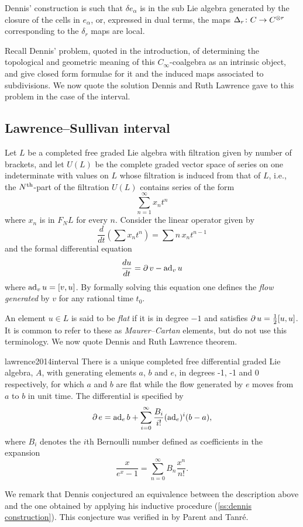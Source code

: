 Dennis' construction is such that $\delta e_\alpha$ is in the sub Lie algebra generated by the closure of the cells in $e_\alpha$, or, expressed in dual terms, the maps $\operatorname{\Delta}_r \colon C \to C^{\otimes r}$ corresponding to the $\delta_r$ maps are local.

Recall Dennis' problem, quoted in the introduction, of determining the topological and geometric meaning of this $C_\infty$-coalgebra as an intrinsic object, and give closed form formulae for it and the induced maps associated to subdivisions.
We now quote the solution Dennis and Ruth Lawrence gave to this problem in the case of the interval.

\subsection{Lawrence--Sullivan interval} \label{ss:LS interval}

Let $L$ be a completed free graded Lie algebra with filtration given by number of brackets, and let $U(L)$ be the complete graded vector space of series on one indeterminate with values on $L$ whose filtration is induced from that of $L$, i.e., the $N^{\mathrm{th}}$-part of the filtration $U(L)$ contains series of the form
\[
\sum_{n=1}^\infty x_n t^n
\]
where $x_n$ is in $F_N L$ for every $n$.
Consider the linear operator given by
\[
\frac{d}{dt} \left(\sum x_n t^n\right) = \sum n \, x_n t^{n-1}
\]
and the formal differential equation
\[
\frac{du}{dt} = \operatorname{\partial} v - \operatorname{ad}_v u
\]
where $\operatorname{ad}_v u = [v, u]$.
By formally solving this equation one defines the \textit{flow generated} by $v$ for any rational time $t_0$.

An element $u \in L$ is said to be \textit{flat} if it is in degree $-1$ and satisfies $\operatorname{\partial} u = \frac{1}{2} [u,u]$.
It is common to refer to these as \textit{Maurer--Cartan} elements, but do not use this terminology.
We now quote Dennis and Ruth Lawrence theorem.
\begin{displaycquote}[Theorem 1]{lawrence2014interval}
	There is a unique completed free differential graded Lie algebra, $A$, with generating elements $a$, $b$ and $e$, in degrees -1, -1 and 0 respectively, for which $a$ and $b$ are flat while the flow generated by $e$ moves from $a$ to $b$ in unit time.
	The differential is specified by
	\[
	\operatorname{\partial} e = \operatorname{ad}_e b + \sum_{i=0}^{\infty} \frac{B_i}{i!}(\operatorname{ad}_e)^i(b-a),
	\]
	where $B_i$ denotes the $i$th Bernoulli number defined as coefficients in the expansion
	\[
	\frac{x}{e^x-1} = \sum_{n=0}^{\infty} B_n \frac{x^n}{n!}.
	\]
\end{displaycquote}
We remark that Dennis conjectured an equivalence between the description above and the one obtained by applying his inductive procedure (\cref{ss:dennis construction}).
This conjecture was verified in \cite{parent2012interval} by Parent and Tanr\'{e}.

